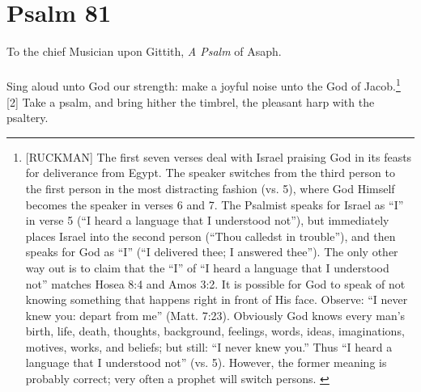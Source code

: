 \chapter{Psalm 81}
\textcolor[rgb]{0.00,0.00,1.00}{To the chief Musician upon Gittith, \emph{A Psalm} of Asaph.}\\
\\
\textcolor[rgb]{0.00,0.00,1.00}{Sing aloud unto God our strength: make a joyful noise unto the God of Jacob.}\footnote{[RUCKMAN]  The first seven verses deal with Israel praising God in its feasts for deliverance from Egypt. The speaker switches from the third person to the first person in the most distracting fashion (vs. 5), where God Himself becomes the speaker in verses 6 and 7. The Psalmist speaks for Israel as “I” in verse 5 (“I heard a language that I understood not”), but immediately places Israel into the second person (“Thou calledst in trouble”), and then speaks for God as “I” (“I delivered thee; I answered thee”). The only other way out is to claim that the “I” of “I heard a language that I understood not” matches Hosea 8:4 and Amos 3:2. It is possible for God to speak of not knowing something that happens right in front of His face. Observe: “I never knew you: depart from me” (Matt. 7:23). Obviously God knows every man’s birth, life, death, thoughts, background, feelings, words, ideas, imaginations, motives, works, and beliefs; but still: “I never knew you.” Thus “I heard a language that I understood not” (vs. 5). However, the former meaning is probably correct; very often a prophet will switch persons. \cite{Ruckman1992Psalms}  }
[2] \textcolor[rgb]{0.00,0.00,1.00}{Take a psalm, and bring hither the timbrel, the pleasant harp with the psaltery.}
